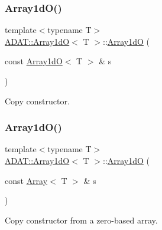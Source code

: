 \subsubsection{\texorpdfstring{Array1dO()}{Array1dO()}\hspace{0.1cm}{\footnotesize\ttfamily [3/10]}}
{\footnotesize\ttfamily template$<$typename T$>$ \\
\mbox{\hyperlink{classADAT_1_1Array1dO}{A\+D\+A\+T\+::\+Array1dO}}$<$ T $>$\+::\mbox{\hyperlink{classADAT_1_1Array1dO}{Array1dO}} (\begin{DoxyParamCaption}\item[{const \mbox{\hyperlink{classADAT_1_1Array1dO}{Array1dO}}$<$ T $>$ \&}]{s }\end{DoxyParamCaption})\hspace{0.3cm}{\ttfamily [inline]}}



Copy constructor. 

\mbox{\label{classADAT_1_1Array1dO_adcc074ae1935a9371a950d1a99bfa3ec}} 
\subsubsection{\texorpdfstring{Array1dO()}{Array1dO()}\hspace{0.1cm}{\footnotesize\ttfamily [4/10]}}
{\footnotesize\ttfamily template$<$typename T$>$ \\
\mbox{\hyperlink{classADAT_1_1Array1dO}{A\+D\+A\+T\+::\+Array1dO}}$<$ T $>$\+::\mbox{\hyperlink{classADAT_1_1Array1dO}{Array1dO}} (\begin{DoxyParamCaption}\item[{const \mbox{\hyperlink{classXMLArray_1_1Array}{Array}}$<$ T $>$ \&}]{s }\end{DoxyParamCaption})\hspace{0.3cm}{\ttfamily [inline]}}



Copy constructor from a zero-\/based array. 

\mbox{\label{classADAT_1_1Array1dO_aad6c2df87d1dc941fd561fd74d181ddc}} 
